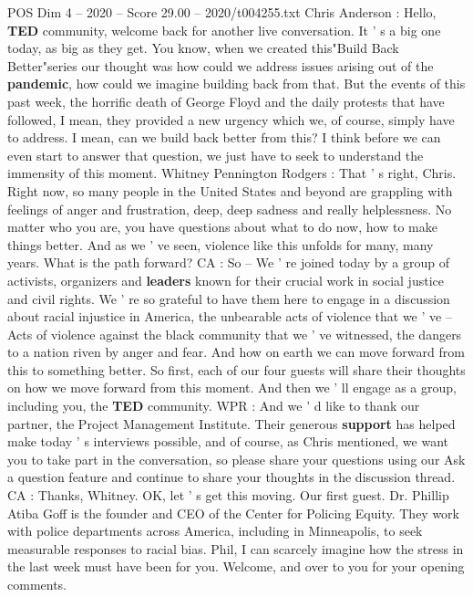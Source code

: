 \begin{textsample}{POS Dim 4 – 2020 – Score 29.00 – 2020/t004255.txt}  \label{ex:f4_pos_023}
Chris Anderson : Hello, \textbf{TED} community, welcome back for another live conversation.
It ' s a big one today, as big as they get.
You know, when we created this"Build Back Better"series our thought was how could we address issues arising out of the \textbf{pandemic}, how could we imagine building back from that.
But the events of this past week, the horrific death of George Floyd and the daily protests that have followed, I mean, they provided a new urgency which we, of course, simply have to address.
I mean, can we build back better from this?
I think before we can even start to answer that question, we just have to seek to understand the immensity of this moment.
Whitney Pennington Rodgers : That ' s right, Chris.
Right now, so many people in the United States and beyond are grappling with feelings of anger and frustration, deep, deep sadness and really helplessness.
No matter who you are, you have questions about what to do now, how to make things better.
And as we ' ve seen, violence like this unfolds for many, many years.
What is the path forward?
CA : So -- We ' re joined today by a group of activists, organizers and \textbf{leaders} known for their crucial work in social justice and civil rights.
We ' re so grateful to have them here to engage in a discussion about racial injustice in America, the unbearable acts of violence that we ' ve -- Acts of violence against the black community that we ' ve witnessed, the dangers to a nation riven by anger and fear.
And how on earth we can move forward from this to something better.
So first, each of our four guests will share their thoughts on how we move forward from this moment.
And then we ' ll engage as a group, including you, the \textbf{TED} community.
WPR : And we ' d like to thank our partner, the Project Management Institute.
Their generous \textbf{support} has helped make today ' s interviews possible, and of course, as Chris mentioned, we want you to take part in the conversation, so please share your questions using our Ask a question feature and continue to share your thoughts in the discussion thread.
CA : Thanks, Whitney.
OK, let ' s get this moving.
Our first guest.
Dr.
Phillip Atiba Goff is the founder and CEO of the Center for Policing Equity.
They work with police departments across America, including in Minneapolis, to seek measurable responses to racial bias.
Phil, I can scarcely imagine how the stress in the last week must have been for you.
Welcome, and over to you for your opening comments.

\end{textsample}
